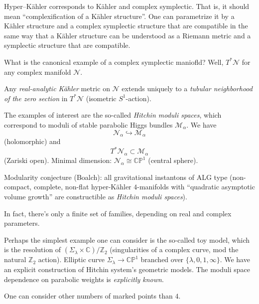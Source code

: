 \documentclass[reqno]{amsart} 
\numberwithin{theorem}{section}
\numberwithin{equation}{section}
\begin{document}
Hyper--K\"{a}hler corresponds to K\"{a}hler and complex symplectic.  That is, it should mean ``complexification of a K\"{a}hler structure''.  One can parametrize it by a K\"{a}hler structure and a complex symplectic structure that are compatible in the same way that a K\"{a}hler structure can be understood as a Riemann metric and a symplectic structure that are compatible.

What is the canonical example of a complex symplectic maniofld?  Well, $T^\ast \mathcal{N}$ for any complex manifold $\mathcal{N}$.

\begin{theorem}
  Any \emph{real-analytic K\"{a}hler} metric on $\mathcal{N}$ extends uniquely to a \emph{tubular neighborhood of the zero section} in $T^\ast \mathcal{N}$ (isometric $S^1$-action).
\end{theorem}

The examples of interest are the so-called \emph{Hitchin moduli spaces}, which correspond to moduli of stable parabolic Higgs bundles $\mathcal{M}_\alpha$.  We have
\begin{equation*}
  \mathcal{N}_\alpha \hookrightarrow \mathcal{M}_\alpha
\end{equation*}
(holomorphic) and
\begin{equation*}
  T^\ast \mathcal{N}_\alpha \subset \mathcal{M}_\alpha
\end{equation*}
(Zariski open).  Minimal dimension: $\mathcal{N}_\alpha \cong \mathbb{C} \mathbb{P}^1$ (central sphere).

Modularity conjecture (Boalch): all gravitational instantons of ALG type (non-compact, complete, non-flat hyper-K\"{a}hler $4$-manifolds with ``quadratic asymptotic volume growth'' are constructible as \emph{Hitchin moduli spaces}).

In fact, there's only a finite set of families, depending on real and complex parameters.

Perhaps the simplest example one can consider is the so-called toy model, which is the resolution of $(\Sigma_\lambda \times \mathbb{C}) / \mathbb{Z}_2$ (singularities of a complex curve, mod the natural $\mathbb{Z}_2$ action).  Elliptic curve $\Sigma_\lambda \rightarrow \mathbb{C} \mathbb{P}^1$ branched over $\{\lambda, 0, 1, \infty\}$.  We have an explicit construction of Hitchin system's geometric models.  The moduli space dependence on parabolic weights is \emph{explicitly known}.

\begin{remark}
  One can consider other numbers of marked points than $4$.
\end{remark}
\end{document}
